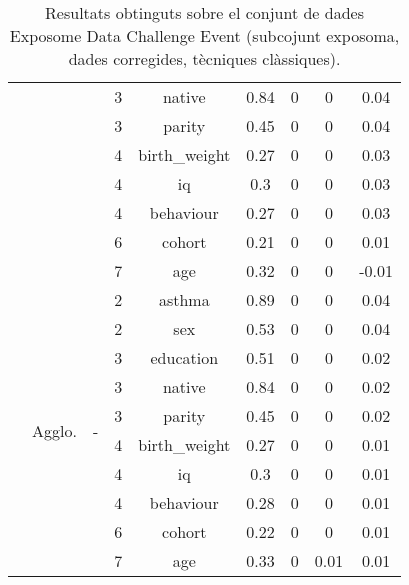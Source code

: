\documentclass[CAT,BIB]{TFUOC}%
\begin{document}
\begin{table}
\begin{tabular}{@{}ccccccccc@{}}
            &  &  & 3 & native & 0.84 & 0 & 0 & 0.04 \\
            &  &  & 3 & parity & 0.45 & 0 & 0 & 0.04 \\
            &  &  & 4 & birth\_weight & 0.27 & 0 & 0 & 0.03 \\
            &  &  & 4 & iq & 0.3 & 0 & 0 & 0.03 \\
            &  &  & 4 & behaviour & 0.27 & 0 & 0 & 0.03 \\
            &  &  & 6 & cohort & 0.21 & 0 & 0 & 0.01 \\
            &  &  & 7 & age & 0.32 & 0 & 0 & -0.01 \\ \cmidrule(l){2-9}
            & \multirow{10}{*}{Agglo.} & \multirow{10}{*}{-} & 2 & asthma & 0.89 & 0 & 0 & 0.04 \\
            &  &  & 2 & sex & 0.53 & 0 & 0 & 0.04 \\
            &  &  & 3 & education & 0.51 & 0 & 0 & 0.02 \\
            &  &  & 3 & native & 0.84 & 0 & 0 & 0.02 \\
            &  &  & 3 & parity & 0.45 & 0 & 0 & 0.02 \\
            &  &  & 4 & birth\_weight & 0.27 & 0 & 0 & 0.01 \\
            &  &  & 4 & iq & 0.3 & 0 & 0 & 0.01 \\
            &  &  & 4 & behaviour & 0.28 & 0 & 0 & 0.01 \\
            &  &  & 6 & cohort & 0.22 & 0 & 0 & 0.01 \\
            &  &  & 7 & age & 0.33 & 0 & 0.01 & 0.01 \\ \bottomrule
        \end{tabular}
        \caption[Exposome Data Challenge Event: resultats - part 9]{
            Resultats obtinguts sobre el conjunt de dades Exposome Data Challenge Event
            (subcojunt exposoma, dades corregides, tècniques clàssiques).
        }
        \label{t:results_exposome9}
    \end{table}
\end{document}
